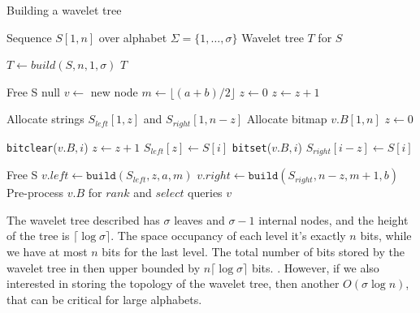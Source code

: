 \begin{algorithm}[h!]
    \caption{Building a wavelet tree}\label{alg:build_wt}
    \begin{algorithmic}
        \Require Sequence $S[1,n]$ over alphabet $\Sigma = \{1,\dots,\sigma\}$
        \Ensure Wavelet tree $T$ for $S$
        \vspace{0.4cm}

        \State $T \gets build(S,n,1,\sigma)$
        \State \Return $T$
        \EndFunction

        \vspace{0.4cm}
         
        \State Free S
        \State \Return null
        \EndIf
        \State $v \gets$ new node
        \State $m \gets \lfloor (a+b)/2 \rfloor$
        \State $z \gets 0$ 
        \State $z \gets z+1$
        \EndIf
        \EndFor

        \State Allocate strings $S_{left}[1,z]$ and $S_{right}[1,n-z]$
        \State Allocate bitmap $v.B[1,n]$
        \State $z \gets 0$

        \State \texttt{bitclear}($v.B,i$) 
        \State $z \gets z+1$
        \State $S_{left}[z] \gets S[i]$
        \Else
        \State \texttt{bitset}($v.B,i$) 
        \State $S_{right}[i-z] \gets S[i]$
        \EndIf
        \EndFor

        \State Free S
        \State $v.left \gets \texttt{build}(S_{left},z,a,m)$
        \State $v.right \gets \texttt{build}(S_{right},n-z,m+1,b)$
        \State Pre-process $v.B$ for $rank$ and $select$ queries
        \State \Return $v$
        \EndFunction
    \end{algorithmic}
\end{algorithm}


\begin{remark} \label{rem:space_occupancy_wavelet_tree}
    The wavelet tree described has $\sigma$ leaves and $\sigma-1$ internal nodes, and the height of the tree is $ \lceil \log \sigma \rceil$. The space occupancy of each level it's exactly $n$ bits, while we have at most $n$ bits for the last level. The total number of bits stored by the wavelet tree in then upper bounded by $n \lceil \log \sigma \rceil$ bits. \cite{WTForALL}. However, if we also interested in storing the topology of the wavelet tree, then another $O(\sigma \log n)$, that can be critical for large alphabets. \cite{WTForALL}
\end{remark}

